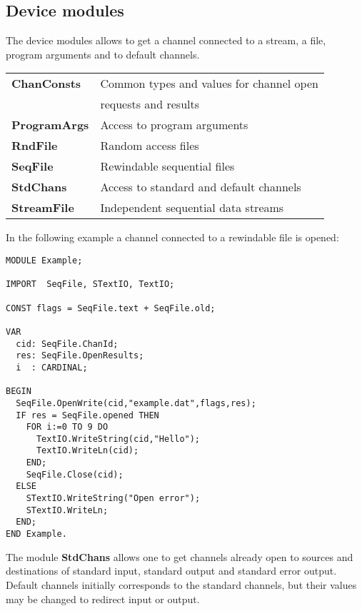 \subsection{Device modules}\label{lib:ISO:device}

The device modules allows to get a channel connected to a stream,
a file, program arguments and to default channels.

\begin{flushleft}
\begin{tabular}{ll}
\bf ChanConsts  & Common types and values for channel open \\
                & requests and results                                   \\
\bf ProgramArgs & Access to program arguments                            \\
\bf RndFile     & Random access files                                    \\
\bf SeqFile     & Rewindable sequential files                            \\
\bf StdChans    & Access to standard and default channels                \\
\bf StreamFile  & Independent sequential data streams                    \\
\end{tabular}
\end{flushleft}

\noindent
In the following example a channel connected to a rewindable
file is opened:
\begin{verbatim}
MODULE Example;

IMPORT  SeqFile, STextIO, TextIO;

CONST flags = SeqFile.text + SeqFile.old;

VAR
  cid: SeqFile.ChanId;
  res: SeqFile.OpenResults;
  i  : CARDINAL;

BEGIN
  SeqFile.OpenWrite(cid,"example.dat",flags,res);
  IF res = SeqFile.opened THEN
    FOR i:=0 TO 9 DO
      TextIO.WriteString(cid,"Hello");
      TextIO.WriteLn(cid);
    END;
    SeqFile.Close(cid);
  ELSE
    STextIO.WriteString("Open error");
    STextIO.WriteLn;
  END;
END Example.
\end{verbatim}

The module {\bf StdChans} allows one to get channels already open to
sources and destinations of standard input, standard output and
standard error output. Default channels initially corresponds to
the standard channels, but their values may be changed to
redirect input or output.

